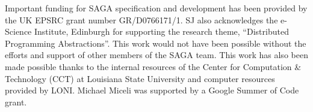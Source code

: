 \documentclass[conference,final]{IEEEtran}
\begin{document}
Important funding for SAGA specification and development has been
provided by the UK EPSRC grant number GR/D0766171/1.  SJ also
acknowledges the e-Science Institute, Edinburgh for supporting the
research theme, ``Distributed Programming Abstractions''.  This work
would not have been possible without the efforts and support of other
members of the SAGA team. This work has also been made possible thanks
to the internal resources of the Center for Computation \& Technology
(CCT) at Louisiana State University and computer resources provided by
LONI. Michael Miceli was supported by a Google Summer of Code grant.
 
\end{document}

